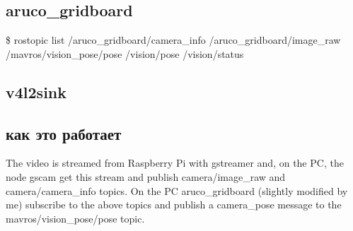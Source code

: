 \subsection{aruco\_gridboard}

\$ rostopic list
/aruco\_gridboard/camera\_info
/aruco\_gridboard/image\_raw
/mavros/vision\_pose/pose
/vision/pose
/vision/status
\subsection{v4l2sink}
\subsection{как это работает}
The video is streamed from Raspberry Pi with gstreamer and, on the PC, the node gscam get this stream and publish camera/image\_raw and camera/camera\_info topics.
On the PC aruco\_gridboard (slightly modified by me) subscribe to the above topics and publish a camera\_pose message to the mavros/vision\_pose/pose topic.

